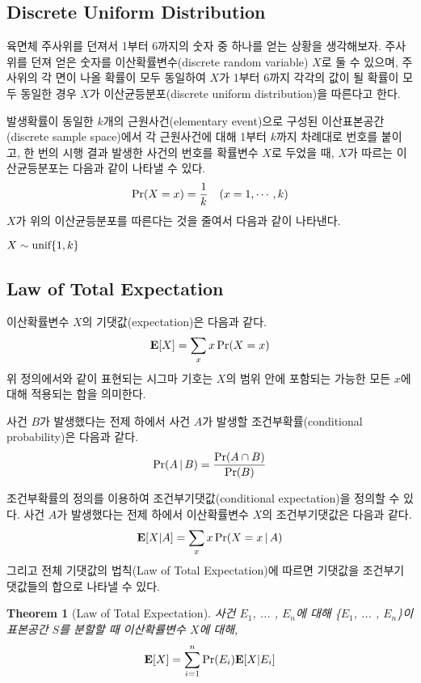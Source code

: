 \documentclass[11pt]{article}
\newtheorem*{theorem_}{Theorem}
\begin{document}
\subsection{Discrete Uniform Distribution}
육면체 주사위를 던져서 1부터 6까지의 숫자 중 하나를 얻는 상황을 생각해보자. 주사위를 던져 얻은 숫자를 이산확률변수(discrete random variable) $X$로 둘 수 있으며, 주사위의 각 면이 나올 확률이 모두 동일하여 $X$가 1부터 6까지 각각의 값이 될 확률이 모두 동일한 경우 $X$가 이산균등분포(discrete uniform distribution)을 따른다고 한다.

발생확률이 동일한 $k$개의 근원사건(elementary event)으로 구성된 이산표본공간(discrete sample space)에서 각 근원사건에 대해 1부터 $k$까지 차례대로 번호를 붙이고, 한 번의 시행 결과 발생한 사건의 번호를 확률변수 $X$로 두었을 때, $X$가 따르는 이산균등분포는 다음과 같이 나타낼 수 있다.
\[\textnormal{Pr}(X = x) = \frac{1}{k} \quad(x = 1,\cdots, k)\]
$X$가 위의 이산균등분포를 따른다는 것을 줄여서 다음과 같이 나타낸다.
\begin{center}
$X \sim \textnormal{unif}\{1, k\}$
\end{center}

\subsection{Law of Total Expectation}
이산확률변수 $X$의 기댓값(expectation)은 다음과 같다.
\[\textbf{E}[X] = \sum_{x} x\,\textnormal{Pr}(X = x)\]
위 정의에서와 같이 표현되는 시그마 기호는 $X$의 범위 안에 포함되는 가능한 모든 $x$에 대해 적용되는 합을 의미한다.

사건 $B$가 발생했다는 전제 하에서 사건 $A$가 발생할 조건부확률(conditional probability)은 다음과 같다.
\[\textnormal{Pr}(A\,|\,B) = \frac{\textnormal{Pr}(A \cap B)}{\textnormal{Pr}(B)}\]

조건부확률의 정의를 이용하여 조건부기댓값(conditional expectation)을 정의할 수 있다. 사건 $A$가 발생했다는 전제 하에서 이산확률변수 $X$의 조건부기댓값은 다음과 같다.
\[\textbf{E}[X|A] = \sum_{x} x\,\textnormal{Pr}(X = x\,|\,A)\]
그리고 전체 기댓값의 법칙(Law of Total Expectation)에 따르면 기댓값을 조건부기댓값들의 합으로 나타낼 수 있다.

\singlespacing
\begin{theorem_}[Law of Total Expectation]
사건 $E_{1}$, ... , $E_{n}$에 대해 \{$E_{1}$, ... , $E_{n}$\}이 표본공간 $S$를 분할할 때 이산확률변수 $X$에 대해,
\[\textnormal{\textbf{E}}[X] = \sum_{i=1}^{n} \textnormal{Pr}(E_{i})\textnormal{\textbf{E}}[X|E_{i}]\]

\end{theorem_}
\doublespacing
\end{document}
